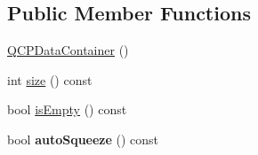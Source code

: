\subsection*{Public Member Functions}
\begin{DoxyCompactItemize}
\item 
\hyperlink{classQCPDataContainer_af86c0c63719f92c360ff67cc06c6fe6f}{Q\+C\+P\+Data\+Container} ()
\item 
int \hyperlink{classQCPDataContainer_a09003591d8812dea7a548c500b62750a}{size} () const 
\item 
bool \hyperlink{classQCPDataContainer_af2a4d189394da4a3e78bf52ff6945f1d}{is\+Empty} () const 
\item 
bool {\bfseries auto\+Squeeze} () const \hypertarget{classQCPDataContainer_a998f6e133f162f32818ca529a0be7355}{}\label{classQCPDataContainer_a998f6e133f162f32818ca529a0be7355}


\end{DoxyCompactItemize}
